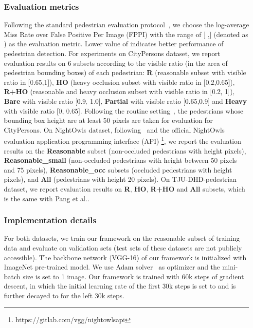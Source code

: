 \documentclass[journal]{IEEEtran}
\begin{document}
\subsubsection{Evaluation metrics}
Following the standard pedestrian evaluation protocol~\cite{dollar2011pedestrian}, we choose the log-average Miss Rate over False Positive Per Image (FPPI)  with the range of [
,] (denoted as ) as the evaluation metric. Lower value of  indicates better performance of pedestrian detection. 
For experiments on CityPersons dataset, we report evaluation results on 6 subsets according to the visible ratio (in the area of pedestrian bounding boxes) of each pedestrian: \textbf{R} (reasonable subset with visible ratio in [0.65,1]),  \textbf{HO} (heavy occlusion subset with visible ratio in [0.2,0.65]), \textbf{R+HO} (reasonable and heavy occlusion subset with visible ratio in [0.2, 1]), \textbf{Bare} with visible ratio [0.9, 1.0], \textbf{Partial} with visible ratio [0.65,0.9] and \textbf{Heavy} with visible ratio [0, 0.65].
Following the routine setting~\cite{xie2020count, wu2020temporal}, the pedestrians whose bounding box height are at least 50 pixels are taken for evaluation for CityPersons. On NightOwls dataset, following~\cite{wu2020temporal,neumann2018nightowls} and the official NightOwls evaluation application programming interface (API) \footnote{https://gitlab.com/vgg/nightowlsapi}, we report the evaluation results on the \textbf{Reasonable} subset (non-occluded pedestrians with height   pixels), \textbf{Reasonable\_small} (non-occluded pedestrians  with height between 50 pixels and 75 pixels),  \textbf{Reasonable\_occ} subsets (occluded pedestrians  with height   pixels), and \textbf{All} (pedestrians with height  20 pixels). 
On TJU-DHD-pedestrian dataset, we report evaluation results on \textbf{R}, \textbf{HO}, \textbf{R+HO} and \textbf{All} subsets, which is the same with Pang et al.\cite{pang2020tju}.










\subsubsection{Implementation details}
For both datasets, we train our framework on the reasonable subset of training data and evaluate on validation sets (test sets of these datasets are not publicly accessible). The backbone network (VGG-16) of our framework is initialized with ImageNet pre-trained model. We use Adam solver~\cite{kingma2014adam} as optimizer and the mini-batch size is set to 1 image. 
Our framework is trained with 60k steps of gradient descent, in which the initial learning rate of the first 30k steps is set to  and is further decayed to  for the left 30k steps. 
\end{document}
